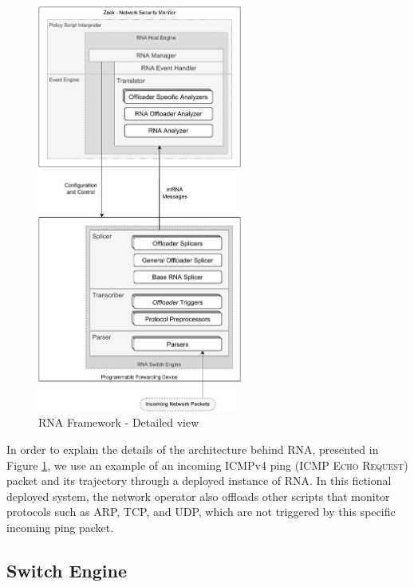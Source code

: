 \begin{figure}[H]
    \caption{RNA Framework - Detailed view}
    \begin{center}
        \includegraphics[width=0.6\textwidth]{images/arch_low_level.pdf}  
    \end{center}
    \label{fig:arch_low_level}
\end{figure}

In order to explain the details of the architecture behind RNA, presented in Figure \ref{fig:arch_low_level}, we use an example of an incoming ICMPv4 ping (\textsc{ICMP Echo Request}) packet and its trajectory through a deployed instance of RNA. In this fictional deployed system, the network operator also offloads other scripts that monitor protocols such as ARP, TCP, and UDP, which are not triggered by this specific incoming ping packet.



\subsection{Switch Engine}

